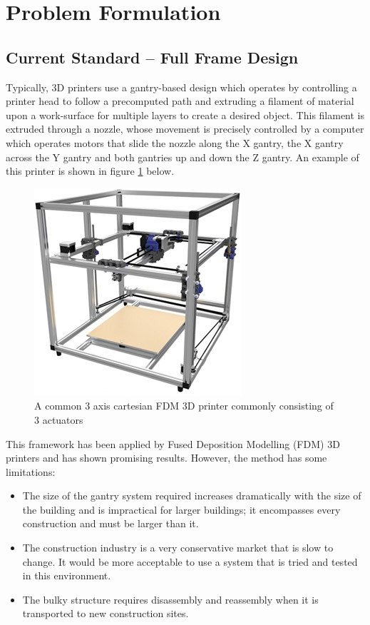 \documentclass{UoNMCHA}
\numberwithin{equation}{section}
\begin{document}
	\newpage
	\section{Problem Formulation}\label{Problem Formulation}
		
	\subsection{Current Standard – Full Frame Design}
	Typically, 3D printers use a gantry-based design which operates by controlling a printer head to follow a precomputed path and extruding a filament of material upon a work-surface for multiple layers to create a desired object. This filament is extruded through a nozzle, whose movement is precisely controlled by a computer which operates motors that slide the nozzle along the X gantry, the X gantry across the Y gantry and both
	gantries up and down the Z gantry. An example of this printer is shown in figure \ref{figs/Picture1} below.

	
	\begin{figure}[H]
		\begin{center}
			\includegraphics[width=.6\linewidth]{figs/Picture1}
			\caption{A  common 3 axis cartesian FDM 3D printer commonly consisting of 3 actuators \cite{medlicott_blog}}
			\label{figs/Picture1}
		\end{center}
	\end{figure}
	
This framework has been applied by Fused Deposition Modelling (FDM) 3D printers and has shown promising results. However, the method has some limitations:\\
	
	\begin{itemize}
		\item The size of the gantry system required increases dramatically with the size of the building and is impractical for larger buildings; it encompasses every construction and must be larger than it.
		\item The construction industry is a very conservative market that is slow to change. It would be more acceptable to use a system that is tried and tested in this environment.
		\item The bulky structure requires disassembly and reassembly when it is transported to new construction sites.
	\end{itemize}
	
\end{document}

